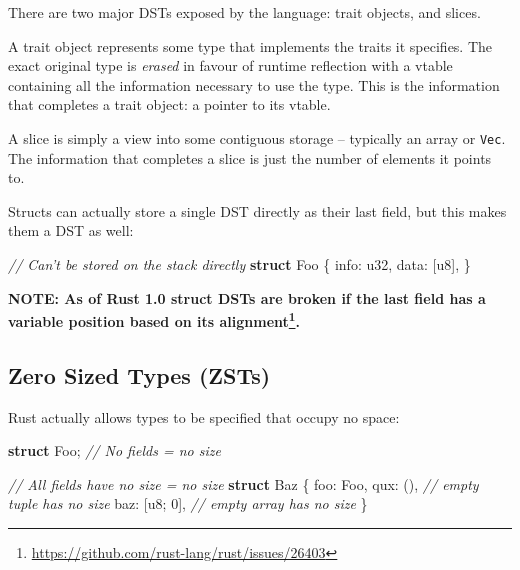 \documentclass[a4paper,]{book}
\newenvironment{Shaded}{\begin{snugshade}}{\end{snugshade}}
\newcommand{\KeywordTok}[1]{\textcolor[rgb]{0.13,0.29,0.53}{\textbf{{#1}}}}
\newcommand{\DataTypeTok}[1]{\textcolor[rgb]{0.13,0.29,0.53}{{#1}}}
\newcommand{\DecValTok}[1]{\textcolor[rgb]{0.00,0.00,0.81}{{#1}}}
\newcommand{\CommentTok}[1]{\textcolor[rgb]{0.56,0.35,0.01}{\textit{{#1}}}}
\newcommand{\NormalTok}[1]{{#1}}
\renewcommand{\href}[2]{#2\footnote{\url{#1}}}
\begin{document}
There are two major DSTs exposed by the language: trait objects, and
slices.

A trait object represents some type that implements the traits it
specifies. The exact original type is \emph{erased} in favour of runtime
reflection with a vtable containing all the information necessary to use
the type. This is the information that completes a trait object: a
pointer to its vtable.

A slice is simply a view into some contiguous storage -- typically an
array or \texttt{Vec}. The information that completes a slice is just
the number of elements it points to.

Structs can actually store a single DST directly as their last field,
but this makes them a DST as well:

\begin{Shaded}
\begin{Highlighting}[]
\CommentTok{// Can't be stored on the stack directly}
\KeywordTok{struct} \NormalTok{Foo \{}
    \NormalTok{info: }\DataTypeTok{u32}\NormalTok{,}
    \NormalTok{data: [}\DataTypeTok{u8}\NormalTok{],}
\NormalTok{\}}
\end{Highlighting}
\end{Shaded}

\textbf{NOTE: \href{https://github.com/rust-lang/rust/issues/26403}{As
of Rust 1.0 struct DSTs are broken if the last field has a variable
position based on its alignment}.}

\subsection{Zero Sized Types (ZSTs)}\label{zero-sized-types-zsts}

Rust actually allows types to be specified that occupy no space:

\begin{Shaded}
\begin{Highlighting}[]
\KeywordTok{struct} \NormalTok{Foo; }\CommentTok{// No fields = no size}

\CommentTok{// All fields have no size = no size}
\KeywordTok{struct} \NormalTok{Baz \{}
    \NormalTok{foo: Foo,}
    \NormalTok{qux: (),      }\CommentTok{// empty tuple has no size}
    \NormalTok{baz: [}\DataTypeTok{u8}\NormalTok{; }\DecValTok{0}\NormalTok{], }\CommentTok{// empty array has no size}
\NormalTok{\}}
\end{Highlighting}
\end{Shaded}
\end{document}

